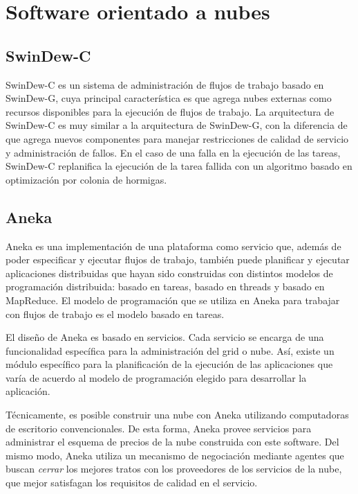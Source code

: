 \section{Software orientado a nubes}

\subsection{SwinDew-C}

SwinDew-C \cite{liu2010swindew} es un sistema de administración de flujos de trabajo basado en SwinDew-G, cuya principal característica es que agrega nubes externas como recursos disponibles para la ejecución de flujos de trabajo. La arquitectura de SwinDew-C es muy similar a la arquitectura de SwinDew-G, con la diferencia de que agrega nuevos componentes para manejar restricciones de calidad de servicio y administración de fallos. En el caso de una falla en la ejecución de las tareas, SwinDew-C replanifica la ejecución de la tarea fallida con un algoritmo basado en optimización por colonia de hormigas.

\subsection{Aneka}

Aneka \cite{chu2007aneka} es una implementación de una plataforma como servicio que, además de poder especificar y ejecutar flujos de trabajo, también puede planificar y ejecutar aplicaciones distribuidas que hayan sido construidas con distintos modelos de programación distribuida: basado en tareas, basado en threads y basado en MapReduce. El modelo de programación que se utiliza en Aneka para trabajar con flujos de trabajo es el modelo basado en tareas.

El diseño de Aneka es basado en servicios. Cada servicio se encarga de una funcionalidad específica para la administración del grid o nube. Así, existe un módulo específico para la planificación de la ejecución de las aplicaciones que varía de acuerdo al modelo de programación elegido para desarrollar la aplicación.

Técnicamente, es posible construir una nube con Aneka \cite{vecchiola2009aneka} utilizando computadoras de escritorio convencionales. De esta forma, Aneka provee servicios para administrar el esquema de precios de la nube construida con este software. Del mismo modo, Aneka utiliza un mecanismo de negociación mediante agentes que buscan \emph{cerrar} los mejores tratos con los proveedores de los servicios de la nube, que mejor satisfagan los requisitos de calidad en el servicio.

